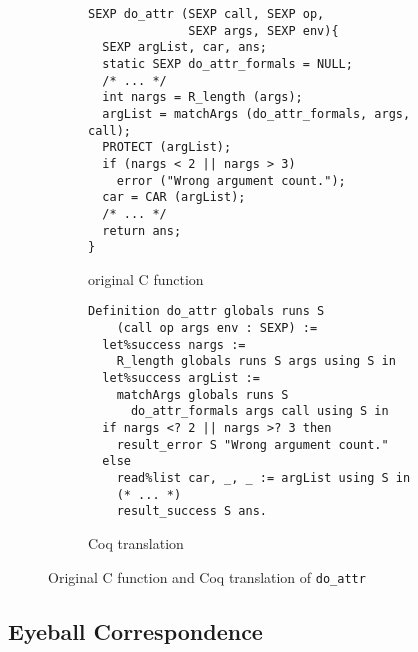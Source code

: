 \documentclass[
    sigplan,
    10pt,
    review, %
    natbib=false %
 ]{acmart}
\newcommand\et[1]{\todo[color=blue!20,size=\scriptsize]{#1}}
\begin{document}
\begin{figure*}[t]
    \centering{}
\begin{subfigure}{.54\textwidth}
\begin{verbatim}
SEXP do_attr (SEXP call, SEXP op,
              SEXP args, SEXP env){
  SEXP argList, car, ans;
  static SEXP do_attr_formals = NULL;
  /* ... */
  int nargs = R_length (args);
  argList = matchArgs (do_attr_formals, args, call);
  PROTECT (argList);
  if (nargs < 2 || nargs > 3)
    error ("Wrong argument count.");
  car = CAR (argList);
  /* ... */
  return ans;
}
\end{verbatim}
\vspace{-0.5em}
    \caption{original C function}
    \label{fig:c:do_attr}
\end{subfigure}
\begin{subfigure}{.45\textwidth}
\begin{verbatim}
Definition do_attr globals runs S
    (call op args env : SEXP) :=
  let%success nargs :=
    R_length globals runs S args using S in
  let%success argList :=
    matchArgs globals runs S
      do_attr_formals args call using S in
  if nargs <? 2 || nargs >? 3 then
    result_error S "Wrong argument count."
  else
    read%list car, _, _ := argList using S in
    (* ... *)
    result_success S ans.
\end{verbatim}
\vspace{-0.5em}
    \caption{Coq translation}
    \label{fig:coq:do_attr}
\end{subfigure}
\vspace{-1em}
    \caption{Original C function and Coq translation of \texttt{do_attr}}
    \label{fig:do_attr}
\end{figure*}

\subsection{Eyeball Correspondence}
\label{sec:eyeball:closeness}


\end{document}
